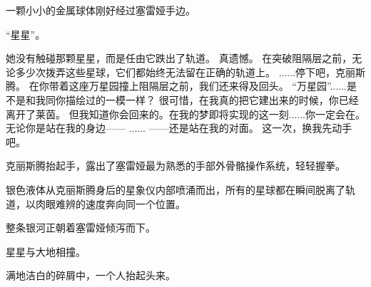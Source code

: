 \documentclass[openany]{book}
\begin{document}
\begin{dialogue}
    一颗小小的金属球体刚好经过塞雷娅手边。\par
    “星星”。\par
    她没有触碰那颗星星，而是任由它跌出了轨道。
     真遗憾。
     在突破阻隔层之前，无论多少次拨弄这些星球，它们都始终无法留在正确的轨道上。
     ......停下吧，克丽斯腾。
     在你带着这座万星园撞上阻隔层之前，我们还来得及回头。
     “万星园”......是不是和我同你描绘过的一模一样？
     很可惜，在我真的把它建出来的时候，你已经离开了莱茵。
     但我知道你会回来的。在我的梦即将实现的这一刻......你一定会在。
     无论你是站在我的身边——
     ......
     ——还是站在我的对面。
     这一次，换我先动手吧。\par
    克丽斯腾抬起手，露出了塞雷娅最为熟悉的手部外骨骼操作系统，轻轻握拳。\par
    银色液体从克丽斯腾身后的星象仪内部喷涌而出，所有的星球都在瞬间脱离了轨道，以肉眼难辨的速度奔向同一个位置。\par
    整条银河正朝着塞雷娅倾泻而下。
\end{dialogue}\par

星星与大地相撞。\par
满地洁白的碎屑中，一个人抬起头来。
\end{document}

